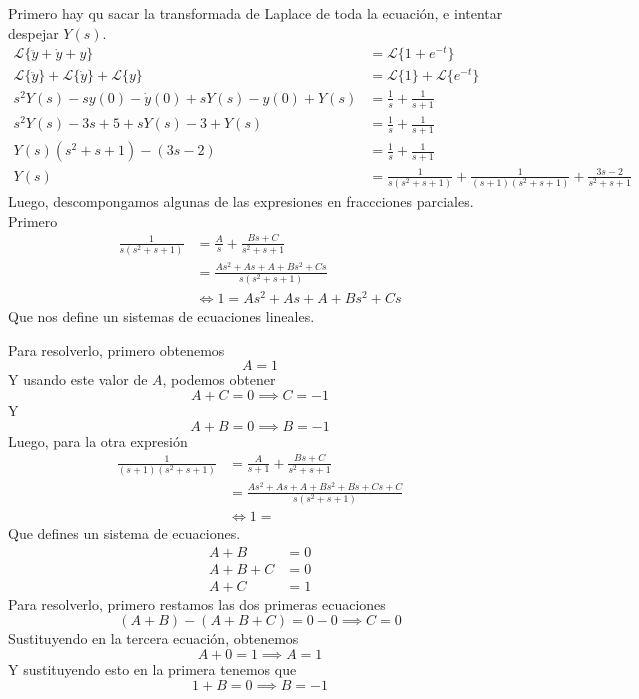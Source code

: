 \documentclass{article}
\begin{document}
\begin{enumerate}
{            Primero hay qu sacar la transformada de 
            Laplace de toda la ecuación, e intentar despejar $Y(s)$.
            \begin{align*}
                \mathcal{L}\{\ddot y + \dot y + y\} &= \mathcal{L}\{1 + e^{-t}\}\\
                \mathcal{L}\{\ddot y\} + \mathcal{L}\{\dot y\} + \mathcal{L}\{y\}
                &= \mathcal{L}\{1\} + \mathcal{L}\{e^{-t}\} \\
                s^2 Y(s) - s y(0) - \dot y(0) + sY(s) - y(0) + Y(s) &= \frac{1}{s}
                + \frac{1}{s+1} \\
                s^2 Y(s) - 3s + 5 + s Y(s) - 3 + Y(s) &= \frac{1}{s} + \frac{1}{s+1}\\
                Y(s) (s^2 + s + 1) - (3s-2) &= \frac{1}{s} + \frac{1}{s+1}\\
                Y(s) &= \frac{1}{s(s^2 + s + 1)} + \frac{1}{(s+1)(s^2 + s + 1)} 
                + \frac{3s-2}{s^2 + s + 1}
            \end{align*}
            Luego, descompongamos algunas de las expresiones en fraccciones
            parciales.
            Primero
            \begin{align*}
                \frac{1}{s(s^2+s+1)} &= \frac{A}{s} + \frac{Bs + C}{s^2+s+1} \\
                &= \frac{As^2+As+A+Bs^2+Cs}{s(s^2+s+1)} \\
                &\iff 1 = As^2+As+A+Bs^2+Cs
            \end{align*}
            Que nos define un sistemas de ecuaciones lineales.

            Para resolverlo, primero obtenemos
            \[A = 1\]
            Y usando este valor de $A$, podemos obtener
            \[A + C = 0 \implies C = -1\]
            Y
            \[A + B = 0 \implies B = -1\]
            Luego, para la otra expresión
            \begin{align*}
                \frac{1}{(s+1)(s^2 + s + 1)} &= \frac{A}{s+1} + \frac{Bs+C}{s^2+s+1} \\
                &= \frac{As^2+As+A+Bs^2+Bs+Cs+C}{s(s^2+s+1)} \\
                &\iff 1 = 
            \end{align*}
            Que defines un sistema de ecuaciones.
            \begin{align*}
                A + B &= 0 \\
                A + B + C &= 0 \\
                A + C &= 1
            \end{align*}
            Para resolverlo, primero restamos las dos primeras ecuaciones
            \[(A+B)-(A+B+C) = 0 - 0 \implies C = 0\]
            Sustituyendo en la tercera ecuación, obtenemos
            \[A + 0 = 1 \implies A = 1\]
            Y sustituyendo esto en la primera tenemos que
            \[1 + B = 0 \implies B = -1\]

}
\end{enumerate}
\end{document}
